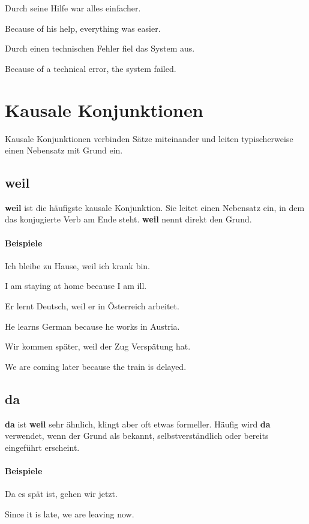\documentclass[a4paper]{article}
\newcommand{\EN}[1]{\par{\small\textcolor{TranslationGray}{#1}}\vspace{0.25em}}
\begin{document}
        Durch seine Hilfe war alles einfacher.\\
        \EN{Because of his help, everything was easier.}
        
        Durch einen technischen Fehler fiel das System aus.\\
        \EN{Because of a technical error, the system failed.}
    
    
    \section{Kausale Konjunktionen}
    Kausale Konjunktionen verbinden Sätze miteinander und leiten typischerweise einen Nebensatz mit Grund ein.
    
    \subsection{weil}
        \textbf{weil} ist die häufigste kausale Konjunktion. Sie leitet einen Nebensatz ein, in dem das konjugierte Verb am Ende steht. \textbf{weil} nennt direkt den Grund.
        
        \paragraph{Beispiele}
            Ich bleibe zu Hause, weil ich krank bin.\\
            \EN{I am staying at home because I am ill.}
            
            Er lernt Deutsch, weil er in Österreich arbeitet.\\
            \EN{He learns German because he works in Austria.}
            
            Wir kommen später, weil der Zug Verspätung hat.\\
            \EN{We are coming later because the train is delayed.}
    
    \subsection{da}
    \textbf{da} ist \textbf{weil} sehr ähnlich, klingt aber oft etwas formeller. Häufig wird \textbf{da} verwendet, wenn der Grund als bekannt, selbstverständlich oder bereits eingeführt erscheint.
    
    \paragraph{Beispiele}
        Da es spät ist, gehen wir jetzt.\\
        \EN{Since it is late, we are leaving now.}
        
\end{document}
